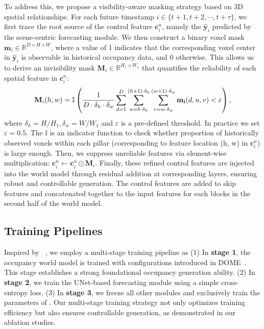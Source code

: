 To address this, we propose a visibility-aware masking strategy based on 3D spatial relationships. 
For each future timestamp $i\in \{t+1, t+2, \cdots, t+\tau\}$, we first trace the root source of the control feature $\mathbf{c}^n_i$, namely the $\mathbf{\hat y}_i$ predicted by the scene-centric forecasting module.
We then construct a binary voxel mask $\mathbf{m}_{i} \in \mathbb{R}^{D \times H\times W}$, where a value of 1 indicates that the corresponding voxel center in $\mathbf{\hat y}_i$ is observable in historical occupancy data, and 0 otherwise. 
This allows us to derive an invisibility mask $\mathbf{M}_{i} \in \mathbb{R}^{H_1\times W_1}$ that  quantifies the reliability of each spatial feature in $\mathbf{c}_i^n$:
\begin{equation}
    \small
    \mathbf{M}_i(h, w) = \mathbb{I}
\left(\frac{1}{D\cdot \delta_h \cdot \delta_w}\sum_{d=1}^{D}\sum_{u=h\cdot \delta_h}^{(h+1)\cdot \delta_h} \sum_{v=w\cdot \delta_w}^{(w+1)\cdot \delta_w} \mathbf{m_i}(d, u, v)  < \varepsilon \right),
\end{equation}
where $\delta_h = H/H_1, \delta_w = W/W_1$ and $\varepsilon$ is a pre-defined threshold. In practice we set $\varepsilon=0.5$.
The $\mathbb{I}$ is an indicator function to check whether proportion of historically observed voxels within each pillar (corresponding to feature location (h, w) in $\mathbf{c}_i^n$) is large enough.
Then, we suppress unreliable features via element-wise multiplication: $\mathbf{c}^n_i \leftarrow \mathbf{c}^n_i \odot \mathbf{M}_i$.
Finally, these refined control features are injected into the world model through residual addition at corresponding layers, ensuring robust and controllable generation. The control features are added to skip features and concatenated together to the input features for each blocks in the second half of the world model.



\subsection{Training Pipelines}\label{sec:method_loss}

Inspired by \ctln{}~\cite{controlnet},  we employ a multi-stage training pipeline as 
(1) In \textbf{stage 1}, the occupancy world model is trained with configurations introduced in DOME~\cite{dome}. 
This stage establishes a strong foundational occupancy generation ability.
(2) In \textbf{stage 2}, we train the UNet-based forecasting module using a simple cross-entropy loss.
(3) In \textbf{stage 3}, we freeze all other modules and exclusively train the parameters of \ctln{}. 
Our multi-stage training strategy not only optimizes training efficiency but also ensures controllable generation, as demonstrated in our ablation studies.


